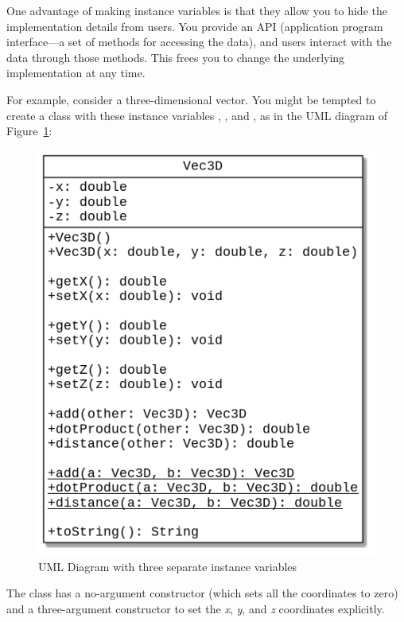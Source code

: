 \begin{exercise}
One advantage of making instance variables  is that they allow you to hide the implementation details from users. You provide an API (application program interface---a set of methods for accessing the data), and users interact with the data through those methods. This frees you to change the underlying implementation at any time.

For example, consider a three-dimensional vector. You might be tempted to create a class with these instance variables , , and , as in the UML diagram of Figure~\ref{fig.vec3d_a}:

\begin{figure}[!h]
\begin{center}
\includegraphics[scale=0.5]{figs/ch11/vec3d_a.png}
\caption{UML Diagram with three separate instance variables}
\label{fig.vec3d_a}
\end{center}
\end{figure}

The class has a no-argument constructor (which sets all the coordinates to zero) and a three-argument constructor to set the {\em x}, {\em y}, and {\em z} coordinates explicitly.


\end{exercise}
